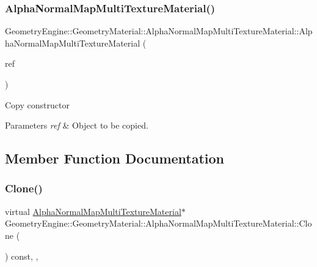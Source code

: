 \subsubsection{\texorpdfstring{AlphaNormalMapMultiTextureMaterial()}{AlphaNormalMapMultiTextureMaterial()}\hspace{0.1cm}{\footnotesize\ttfamily [2/2]}}
{\footnotesize\ttfamily Geometry\+Engine\+::\+Geometry\+Material\+::\+Alpha\+Normal\+Map\+Multi\+Texture\+Material\+::\+Alpha\+Normal\+Map\+Multi\+Texture\+Material (\begin{DoxyParamCaption}\item[{const \mbox{\hyperlink{class_geometry_engine_1_1_geometry_material_1_1_alpha_normal_map_multi_texture_material}{Alpha\+Normal\+Map\+Multi\+Texture\+Material}} \&}]{ref }\end{DoxyParamCaption})}

Copy constructor 
\begin{DoxyParams}{Parameters}
{\em ref} & Object to be copied. \\
\hline
\end{DoxyParams}


\subsection{Member Function Documentation}
\mbox{\label{class_geometry_engine_1_1_geometry_material_1_1_alpha_normal_map_multi_texture_material_afa328c24595fe1456e87db7ad6df2759}} 
\subsubsection{\texorpdfstring{Clone()}{Clone()}}
{\footnotesize\ttfamily virtual \mbox{\hyperlink{class_geometry_engine_1_1_geometry_material_1_1_alpha_normal_map_multi_texture_material}{Alpha\+Normal\+Map\+Multi\+Texture\+Material}}$\ast$ Geometry\+Engine\+::\+Geometry\+Material\+::\+Alpha\+Normal\+Map\+Multi\+Texture\+Material\+::\+Clone (\begin{DoxyParamCaption}{ }\end{DoxyParamCaption}) const\hspace{0.3cm}{\ttfamily [inline]}, {\ttfamily [override]}, {\ttfamily [virtual]}}

